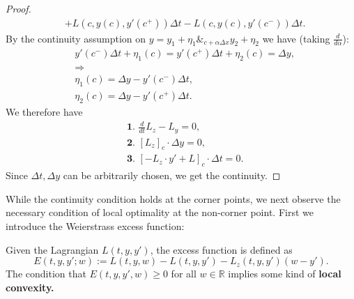 \begin{proof}
\begin{align*}
	& + L(c, y(c), y'(c^+))\Delta t - L(c, y(c), y'(c^-)) \Delta t. 
\end{align*}
By the continuity assumption on $y = y_1 + \eta_1 \&_{c + \alpha \Delta x} y_2 + \eta_2$ we have (taking $\frac{d}{d\alpha}$):
\begin{equation}
\begin{aligned}
	& y'(c^-)\Delta t + \eta_1(c) = y'(c^+)\Delta t + \eta_2(c) = \Delta y,\\
	& \Rightarrow\\
	& \eta_1(c) = \Delta y - y'(c^-) \Delta t, \\
	& \eta_2(c) = \Delta y - y'(c^+) \Delta t. 
\end{aligned}
\end{equation}
We therefore have
\begin{equation}
\begin{aligned}
	& \textbf{1. } \frac{d}{dt} L_z - L_y = 0,\\
	& \textbf{2. } [L_z]_c \cdot \Delta y = 0,\\
	& \textbf{3. } [- L_z \cdot y'  +  L]_c \cdot \Delta t = 0.
\end{aligned}
\end{equation}
Since $\Delta t, \Delta y$ can be arbitrarily chosen, we get the continuity.
\end{proof}

While the continuity condition holds at the corner points, we next observe the necessary condition of local optimality at the non-corner point. First we introduce the Weierstrass excess function:
\begin{definition}
	Given the Lagrangian $L(t, y, y')$, the excess function is defined as 
	\begin{equation}
		E(t, y, y'; w):= L(t, y, w) - L(t, y, y') - L_z(t, y, y')(w - y'). 
	\end{equation}
	The condition that $E(t, y, y', w) \ge 0$ for all $w \in \mathbb{R}$ implies some kind of \textbf{local convexity.}
\end{definition}

